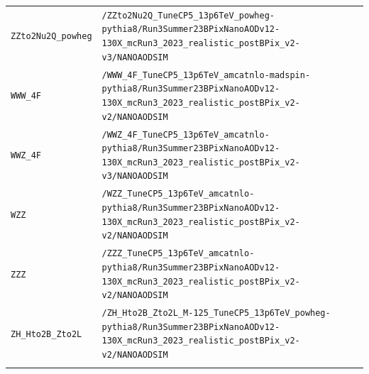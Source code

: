 \begin{longtable}{@{}>{\RaggedRight\arraybackslash}p{} >{\RaggedRight\arraybackslash}p{}@{}}
\addlinespace[2pt]
\texttt{ZZto2Nu2Q\_\allowbreak{}powheg} & \texttt{/\allowbreak{}ZZto2Nu2Q\_\allowbreak{}TuneCP5\_\allowbreak{}13p6TeV\_\allowbreak{}powheg-\allowbreak{}pythia8/\allowbreak{}Run3Summer23BPixNanoAODv12-\allowbreak{}130X\_\allowbreak{}mcRun3\_\allowbreak{}2023\_\allowbreak{}realistic\_\allowbreak{}postBPix\_\allowbreak{}v2-\allowbreak{}v3/\allowbreak{}NANOAODSIM} \\
\addlinespace[2pt]
\texttt{WWW\_\allowbreak{}4F} & \texttt{/\allowbreak{}WWW\_\allowbreak{}4F\_\allowbreak{}TuneCP5\_\allowbreak{}13p6TeV\_\allowbreak{}amcatnlo-\allowbreak{}madspin-\allowbreak{}pythia8/\allowbreak{}Run3Summer23BPixNanoAODv12-\allowbreak{}130X\_\allowbreak{}mcRun3\_\allowbreak{}2023\_\allowbreak{}realistic\_\allowbreak{}postBPix\_\allowbreak{}v2-\allowbreak{}v2/\allowbreak{}NANOAODSIM} \\
\addlinespace[2pt]
\texttt{WWZ\_\allowbreak{}4F} & \texttt{/\allowbreak{}WWZ\_\allowbreak{}4F\_\allowbreak{}TuneCP5\_\allowbreak{}13p6TeV\_\allowbreak{}amcatnlo-\allowbreak{}pythia8/\allowbreak{}Run3Summer23BPixNanoAODv12-\allowbreak{}130X\_\allowbreak{}mcRun3\_\allowbreak{}2023\_\allowbreak{}realistic\_\allowbreak{}postBPix\_\allowbreak{}v2-\allowbreak{}v3/\allowbreak{}NANOAODSIM} \\
\addlinespace[2pt]
\texttt{WZZ} & \texttt{/\allowbreak{}WZZ\_\allowbreak{}TuneCP5\_\allowbreak{}13p6TeV\_\allowbreak{}amcatnlo-\allowbreak{}pythia8/\allowbreak{}Run3Summer23BPixNanoAODv12-\allowbreak{}130X\_\allowbreak{}mcRun3\_\allowbreak{}2023\_\allowbreak{}realistic\_\allowbreak{}postBPix\_\allowbreak{}v2-\allowbreak{}v2/\allowbreak{}NANOAODSIM} \\
\addlinespace[2pt]
\texttt{ZZZ} & \texttt{/\allowbreak{}ZZZ\_\allowbreak{}TuneCP5\_\allowbreak{}13p6TeV\_\allowbreak{}amcatnlo-\allowbreak{}pythia8/\allowbreak{}Run3Summer23BPixNanoAODv12-\allowbreak{}130X\_\allowbreak{}mcRun3\_\allowbreak{}2023\_\allowbreak{}realistic\_\allowbreak{}postBPix\_\allowbreak{}v2-\allowbreak{}v2/\allowbreak{}NANOAODSIM} \\
\addlinespace[2pt]
\texttt{ZH\_\allowbreak{}Hto2B\_\allowbreak{}Zto2L} & \texttt{/\allowbreak{}ZH\_\allowbreak{}Hto2B\_\allowbreak{}Zto2L\_\allowbreak{}M-\allowbreak{}125\_\allowbreak{}TuneCP5\_\allowbreak{}13p6TeV\_\allowbreak{}powheg-\allowbreak{}pythia8/\allowbreak{}Run3Summer23BPixNanoAODv12-\allowbreak{}130X\_\allowbreak{}mcRun3\_\allowbreak{}2023\_\allowbreak{}realistic\_\allowbreak{}postBPix\_\allowbreak{}v2-\allowbreak{}v2/\allowbreak{}NANOAODSIM} \\
\addlinespace[2pt]

\end{longtable}
